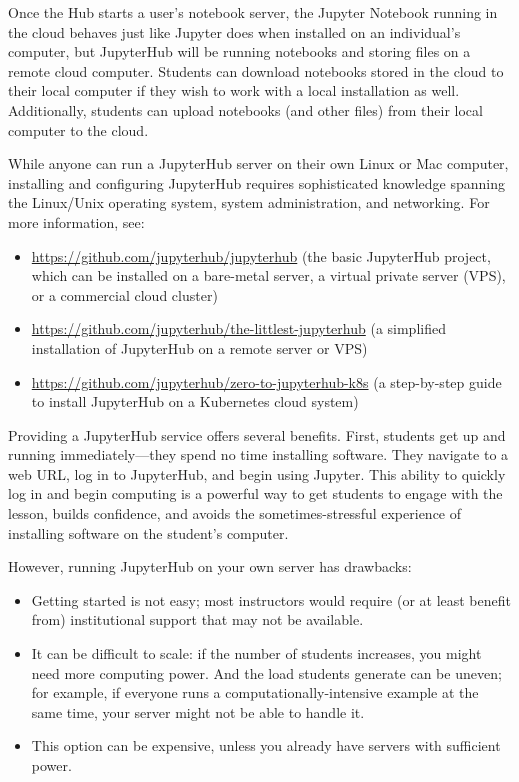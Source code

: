 \documentclass[]{book}
\providecommand{\tightlist}{%
  \setlength{\itemsep}{0pt}\setlength{\parskip}{0pt}}
\begin{document}
Once the Hub starts a user's notebook server, the Jupyter Notebook
running in the cloud behaves just like Jupyter does when installed on an
individual's computer, but JupyterHub will be running notebooks and
storing files on a remote cloud computer. Students can download
notebooks stored in the cloud to their local computer if they wish to
work with a local installation as well. Additionally, students can
upload notebooks (and other files) from their local computer to the
cloud.

While anyone can run a JupyterHub server on their own Linux or Mac
computer, installing and configuring JupyterHub requires sophisticated
knowledge spanning the Linux/Unix operating system, system
administration, and networking. For more information, see:

\begin{itemize}
\tightlist
\item
  \url{https://github.com/jupyterhub/jupyterhub} (the basic JupyterHub
  project, which can be installed on a bare-metal server, a virtual
  private server (VPS), or a commercial cloud cluster)
\item
  \url{https://github.com/jupyterhub/the-littlest-jupyterhub} (a
  simplified installation of JupyterHub on a remote server or VPS)
\item
  \url{https://github.com/jupyterhub/zero-to-jupyterhub-k8s} (a
  step-by-step guide to install JupyterHub on a Kubernetes cloud system)
\end{itemize}

Providing a JupyterHub service offers several benefits. First, students
get up and running immediately---they spend no time installing software.
They navigate to a web URL, log in to JupyterHub, and begin using
Jupyter. This ability to quickly log in and begin computing is a
powerful way to get students to engage with the lesson, builds
confidence, and avoids the sometimes-stressful experience of installing
software on the student's computer.

However, running JupyterHub on your own server has drawbacks:

\begin{itemize}
\tightlist
\item
  Getting started is not easy; most instructors would require (or at
  least benefit from) institutional support that may not be available.
\item
  It can be difficult to scale: if the number of students increases, you
  might need more computing power. And the load students generate can be
  uneven; for example, if everyone runs a computationally-intensive
  example at the same time, your server might not be able to handle it.
\item
  This option can be expensive, unless you already have servers with
  sufficient power.
\end{itemize}
\end{document}
